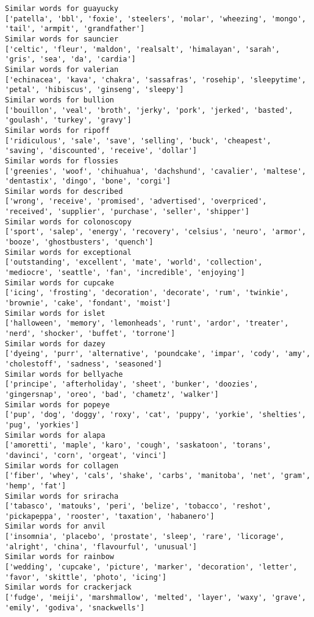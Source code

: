 \documentclass[11pt]{article}
\begin{document}
\begin{Verbatim}[commandchars=\\\{\}]
Similar words for guayucky
['patella', 'bbl', 'foxie', 'steelers', 'molar', 'wheezing', 'mongo', 'tail', 'armpit', 'grandfather']
Similar words for sauncier
['celtic', 'fleur', 'maldon', 'realsalt', 'himalayan', 'sarah', 'gris', 'sea', 'da', 'cardia']
Similar words for valerian
['echinacea', 'kava', 'chakra', 'sassafras', 'rosehip', 'sleepytime', 'petal', 'hibiscus', 'ginseng', 'sleepy']
Similar words for bullion
['bouillon', 'veal', 'broth', 'jerky', 'pork', 'jerked', 'basted', 'goulash', 'turkey', 'gravy']
Similar words for ripoff
['ridiculous', 'sale', 'save', 'selling', 'buck', 'cheapest', 'saving', 'discounted', 'receive', 'dollar']
Similar words for flossies
['greenies', 'woof', 'chihuahua', 'dachshund', 'cavalier', 'maltese', 'dentastix', 'dingo', 'bone', 'corgi']
Similar words for described
['wrong', 'receive', 'promised', 'advertised', 'overpriced', 'received', 'supplier', 'purchase', 'seller', 'shipper']
Similar words for colonoscopy
['sport', 'salep', 'energy', 'recovery', 'celsius', 'neuro', 'armor', 'booze', 'ghostbusters', 'quench']
Similar words for exceptional
['outstanding', 'excellent', 'mate', 'world', 'collection', 'mediocre', 'seattle', 'fan', 'incredible', 'enjoying']
Similar words for cupcake
['icing', 'frosting', 'decoration', 'decorate', 'rum', 'twinkie', 'brownie', 'cake', 'fondant', 'moist']
Similar words for islet
['halloween', 'memory', 'lemonheads', 'runt', 'ardor', 'treater', 'nerd', 'shocker', 'buffet', 'torrone']
Similar words for dazey
['dyeing', 'purr', 'alternative', 'poundcake', 'impar', 'cody', 'amy', 'cholestoff', 'sadness', 'seasoned']
Similar words for bellyache
['principe', 'afterholiday', 'sheet', 'bunker', 'doozies', 'gingersnap', 'oreo', 'bad', 'chametz', 'walker']
Similar words for popeye
['pup', 'dog', 'doggy', 'roxy', 'cat', 'puppy', 'yorkie', 'shelties', 'pug', 'yorkies']
Similar words for alapa
['amoretti', 'maple', 'karo', 'cough', 'saskatoon', 'torans', 'davinci', 'corn', 'orgeat', 'vinci']
Similar words for collagen
['fiber', 'whey', 'cals', 'shake', 'carbs', 'manitoba', 'net', 'gram', 'hemp', 'fat']
Similar words for sriracha
['tabasco', 'matouks', 'peri', 'belize', 'tobacco', 'reshot', 'pickapeppa', 'rooster', 'taxation', 'habanero']
Similar words for anvil
['insomnia', 'placebo', 'prostate', 'sleep', 'rare', 'licorage', 'alright', 'china', 'flavourful', 'unusual']
Similar words for rainbow
['wedding', 'cupcake', 'picture', 'marker', 'decoration', 'letter', 'favor', 'skittle', 'photo', 'icing']
Similar words for crackerjack
['fudge', 'meiji', 'marshmallow', 'melted', 'layer', 'waxy', 'grave', 'emily', 'godiva', 'snackwells']

\end{Verbatim}
\end{document}
